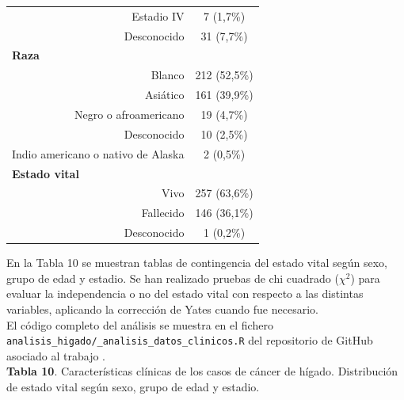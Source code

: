 \begin{table}[H]
\begin{tabular}{rc}
		Estadio IV                                     & 7 (1,7\%)                                        \\
		Desconocido                                    & 31 (7,7\%)                                       \\ \hline
		\multicolumn{1}{l}{\textbf{Raza}}              &                                                  \\
		Blanco                                         & 212 (52,5\%)                                     \\
		Asiático                                       & 161 (39,9\%)                                     \\
		Negro o afroamericano                          & 19 (4,7\%)                                       \\
		Desconocido                                    & 10 (2,5\%)                                       \\
		Indio americano o nativo de Alaska             & 2 (0,5\%)                                        \\ \hline
		\multicolumn{1}{l}{\textbf{Estado vital}}      &                                                  \\ 
		Vivo                                           & 257 (63,6\%)                                     \\
		Fallecido                                         & 146 (36,1\%)                                     \\
		Desconocido                                    & 1 (0,2\%)                                        \\ \hline
	\end{tabular}
\end{table}

En la Tabla 10 se muestran tablas de contingencia del estado vital según sexo, grupo de edad y estadio. Se han realizado pruebas de chi cuadrado ($\chi^2$) \cite{Pearson1900} para evaluar la independencia o no del estado vital con respecto a las distintas variables, aplicando la corrección de Yates \cite{Yates1934} cuando fue necesario.\\

El código completo del análisis se muestra en el fichero \texttt{analisis\_higado/\_analisis\_datos\_clinicos.R} del repositorio de GitHub asociado al trabajo \cite{Redondo-Sanchez2020}.\\

\textbf{Tabla 10}. Características clínicas de los casos de cáncer de hígado. Distribución de  estado vital según sexo, grupo de edad y estadio.

